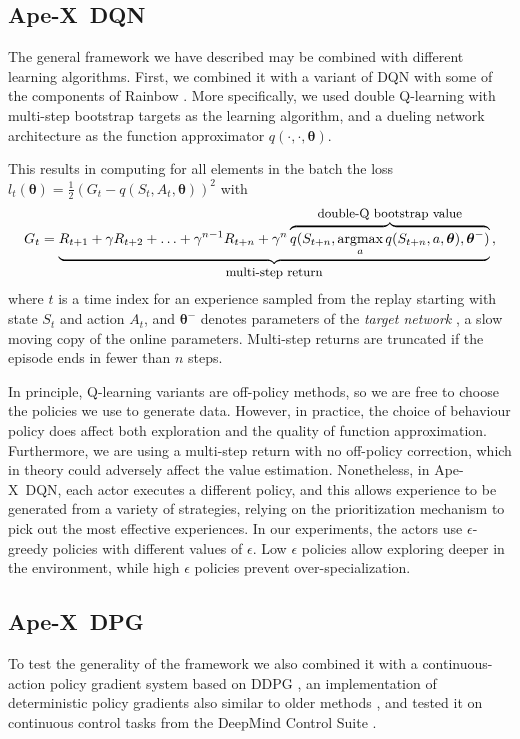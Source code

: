 \documentclass{article} %
\def\apex{Ape-X}
\def\th{{\bm \theta}}
\DeclareMathOperator*{\argmax}{\mbox{argmax}}
\begin{document}
\subsection{\apex\ DQN}

The general framework we have described may be combined with different learning algorithms. First, we combined it with a variant of DQN \citep{dqn} with some of the components of Rainbow \citep{rainbow}. More specifically, we used double Q-learning \citep{doubleq, deepdoubleqlearning} with multi-step bootstrap targets \citep[cf.][]{Sutton:1988, SuttonBarto:1998, SuttonBarto:2017, a3c} as the learning algorithm, and a dueling network architecture \citep{dueling} as the function approximator $q(\cdot, \cdot, \th)$.

This results in computing for all elements in the batch the loss $l_t(\th) = \frac{1}{2}(G_t - q(S_t, A_t, \th))^2$ with 
\[
G_t = \underbrace{R_{t+1} + \gamma R_{t+2} + \ldots + \gamma^{n-1} R_{t+n} + \gamma^n \overbrace{q(S_{t+n}, \argmax_a q(S_{t+n}, a, \th), \th^-)}^{\mbox{\small double-Q bootstrap value}}}_{\mbox{\small multi-step return}} \,,
\]
where $t$ is a time index for an experience sampled from the replay starting with state $S_t$ and action $A_t$, and $\th^-$ denotes parameters of the \emph{target network} \citep{dqn}, a slow moving copy of the online parameters. Multi-step returns are truncated if the episode ends in fewer than $n$ steps.

In principle, Q-learning variants are off-policy methods, so we are free to choose the policies we use to generate data. However, in practice, the choice of behaviour policy does affect both exploration and the quality of function approximation. Furthermore, we are using a multi-step return with no off-policy correction, which in theory could adversely affect the value estimation. Nonetheless, in \apex\ DQN, each actor executes a different policy, and this allows experience to be generated from a variety of strategies, relying on the prioritization mechanism to pick out the most effective experiences. In our experiments, the actors use $\epsilon$-greedy policies with different values of $\epsilon$. Low $\epsilon$ policies allow exploring deeper in the environment, while high $\epsilon$ policies prevent over-specialization.

\subsection{\apex\ DPG}

To test the generality of the framework we also combined it with a continuous-action policy gradient system based on DDPG \citep{ddpg}, an implementation of deterministic policy gradients \cite{dpg} also similar to older methods \citep{adhdp,acd}, and tested it on continuous control tasks from the DeepMind Control Suite \citep{tassa2018suite}.
\end{document}
